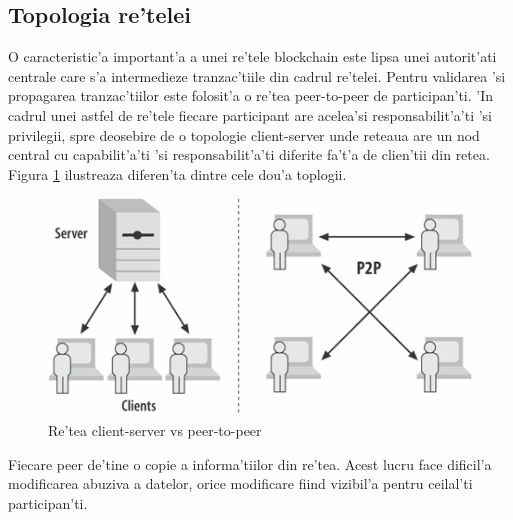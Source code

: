 \documentclass[12pt,a4paper,twoside]{report}
\begin{document}
	\subsection{Topologia re'telei}
	O caracteristic'a important'a a unei re'tele blockchain este lipsa unei autorit'ati centrale care s'a intermedieze tranzac'tiile din cadrul re'telei. Pentru validarea 'si propagarea tranzac'tiilor este folosit'a o re'tea peer-to-peer de participan'ti\cite{p2p}. 'In cadrul unei astfel de re'tele fiecare participant are acelea'si responsabilit'a'ti 'si privilegii, spre deosebire de o topologie client-server unde reteaua are un nod central cu capabilit'a'ti 'si responsabilit'a'ti diferite fa't'a de clien'tii din retea. Figura \ref{fig:p2p} ilustreaza diferen'ta dintre cele dou'a toplogii.
			\begin{figure}[H]
		\begin{center}
			\includegraphics[scale=2]{img/p2p.png}
			\caption{Re'tea client-server vs peer-to-peer\cite{fabricdoc}}
  			\label{fig:p2p}
  		\end{center}
  		\end{figure}
Fiecare peer de'tine o copie a informa'tiilor din re'tea. Acest lucru face dificil'a modificarea abuziva a datelor, orice modificare fiind vizibil'a pentru ceilal'ti participan'ti.   
\end{document}
